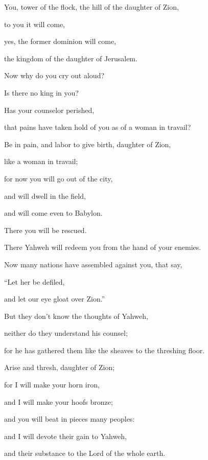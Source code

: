 {\par }{\Q {}You, tower of the flock, the hill of the daughter of Zion,
\par }{\QB to you it will come,
\par }{\QB yes, the former dominion will come,
\par }{\QB the kingdom of the daughter of Jerusalem.
\par }{\Q {}Now why do you cry out aloud?
\par }{\QB Is there no king in you?
\par }{\QB Has your counselor perished,
\par }{\QB that pains have taken hold of you as of a woman in travail?
\par }{\Q {}Be in pain, and labor to give birth, daughter of Zion,
\par }{\QB like a woman in travail;
\par }{\QB for now you will go out of the city,
\par }{\QB and will dwell in the field,
\par }{\QB and will come even to Babylon.
\par }{\Q There you will be rescued.
\par }{\QB There Yahweh will redeem you from the hand of your enemies.
\par }{\Q {}Now many nations have assembled against you, that say,
\par }{\QB “Let her be defiled,
\par }{\QB and let our eye gloat over Zion.”
\par }{\Q {}But they don’t know the thoughts of Yahweh,
\par }{\QB neither do they understand his counsel;
\par }{\QB for he has gathered them like the sheaves to the threshing floor.
\par }{\Q {}Arise and thresh, daughter of Zion;
\par }{\QB for I will make your horn iron,
\par }{\QB and I will make your hoofs bronze;
\par }{\Q and you will beat in pieces many peoples:
\par }{\Q and I will devote their gain to Yahweh,
\par }{\QB and their substance to the Lord of the whole earth.
\par }{\BB \par }
